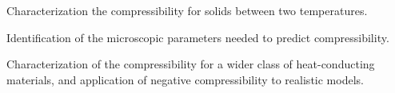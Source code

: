 \begin{workpackage}
\begin{tasklist}
\end{tasklist}

\begin{wpdelivs}
  \begin{wpdeliv}[due=24,id=mydeliv1,dissem=PU,nature=R,lead=UNIPD]
  {Characterization the compressibility for solids between two temperatures.}
  \end{wpdeliv}
  \begin{wpdeliv}[due=36,id=mydeliv2,dissem=PU,nature=DEM,lead=UNIPD]
  {Identification of the microscopic parameters needed to predict compressibility.}
  \end{wpdeliv}
  \begin{wpdeliv}[due=48,id=mydeliv3,dissem=PU,nature=DEM,lead=UNIPD]
  {Characterization of the compressibility for a wider class of heat-conducting materials, and
    application of negative compressibility to realistic models.}
\end{wpdeliv}
\end{wpdelivs}




\end{workpackage}
